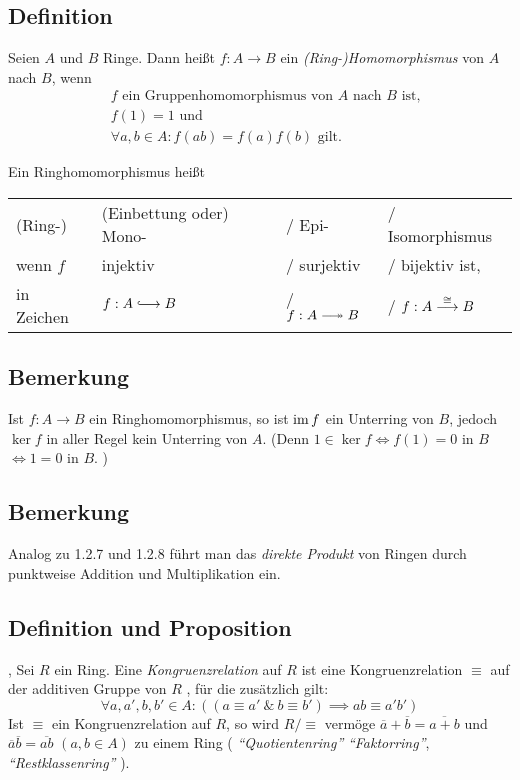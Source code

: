 \subsection{Definition} Seien $A$ und $B$ Ringe. Dann heißt $f: A \to B$ ein \emph{(Ring-)Homomorphismus} von $A$ nach $B$, wenn
\begin{align*}
	&f \text{ ein Gruppenhomomorphismus von } A \text{ nach } B \text{ ist,}\\
	&f(1)=1 \text{ und}\\
	&\forall a,b \in A: f(ab) = f(a)f(b) \text{ gilt.}
\end{align*}

Ein Ringhomomorphismus heißt
\begin{center}
	\begin{tabular}{llll}
		(Ring-) & (Einbettung oder) Mono-  & / Epi- & / Isomorphismus\\
		wenn $f$ & injektiv & / surjektiv & / bijektiv ist, \\
		in Zeichen & $f: A \MAPlongmono B$ & / $f: A \MAPlongepi B$ & / $f: A \overset{\cong}{\longrightarrow} B$
	\end{tabular}
\end{center}

\subsection{Bemerkung} Ist $f: A \to B$ ein Ringhomomorphismus, so ist $\operatorname{im} f$ ein Unterring von $B$, jedoch $\ker f$ in aller Regel kein Unterring von $A$. (Denn $1 \in \ker f \iff f(1)=0$ in $B$ $\iff 1=0$ in $B$. \lightning)
 
\subsection{Bemerkung} Analog zu 1.2.7 und 1.2.8 führt man das \emph{direkte Produkt} von Ringen durch punktweise Addition und Multiplikation ein.
 
\subsection{Definition und Proposition } ,  Sei $R$ ein Ring. Eine \emph{Kongruenzrelation} auf $R$ ist eine Kongruenzrelation $\equiv$  auf der additiven Gruppe von $R$ \ALref{\ref{fixed:1.3.1}}, für die zusätzlich gilt:
\begin{equation*}
	\forall a,a',b,b'\in A:((a\equiv a' ~\&~ b\equiv b')\implies ab\equiv a'b')
\end{equation*}
Ist $\equiv$ ein Kongruenzrelation auf $R$, so wird $R/\equiv$ vermöge $\overline a + \overline b = \overline{a+b}$ und $\overline a \overline b = \overline{ab}$ $(a,b\in A)$ zu einem Ring (
	\emph{"`Quotientenring"'}
	\emph{"`Faktorring"'},
	\emph{"`Restklassenring"'}
).
 
